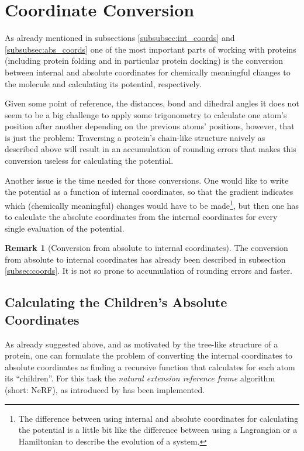 \documentclass[12pt]{article}
\theoremstyle{definition}\newtheorem*{definition}{Definition}
\theoremstyle{definition}\newtheorem*{remark}{Remark}
\begin{document}
\section{Coordinate Conversion}
As already mentioned in subsections \ref{subsubsec:int_coords} and \ref{subsubsec:abs_coords} one of the most important parts of working with proteins (including protein folding and in particular protein docking) is the conversion between internal and absolute coordinates for chemically meaningful changes to the molecule and calculating its potential, respectively.

Given some point of reference, the distances, bond and dihedral angles it does not seem to be a big challenge to apply some trigonometry to calculate one atom's position after another depending on the previous atoms' positions, however, that is just the problem: Traversing a protein's chain-like structure naively as described above will result in an accumulation of rounding errors that makes this conversion useless for calculating the potential.

Another issue is the time needed for those conversions. One would like to write the potential as a function of internal coordinates, so that the gradient indicates which (chemically meaningful) changes would have to be made\footnote{The difference between using internal and absolute coordinates for calculating the potential is a little bit like the difference between using a Lagrangian or a Hamiltonian to describe the evolution of a system.}, but then one has to calculate the absolute coordinates from the internal coordinates for every single evaluation of the potential.

\begin{remark}[Conversion from absolute to internal coordinates]
	The conversion from absolute to internal coordinates has already been described in subsection \ref{subsec:coords}. It is not so prone to accumulation of rounding errors and faster.
\end{remark}

\subsection{Calculating the Children's Absolute Coordinates}
As already suggested above, and as motivated by the tree-like structure of a protein, one can formulate the problem of converting the internal coordinates to absolute coordinates as finding a recursive function that calculates for each atom its ``children''.
For this task the \textit{natural extension reference frame} algorithm (short: NeRF), as introduced by \cite{nerf} has been implemented.
\end{document}
